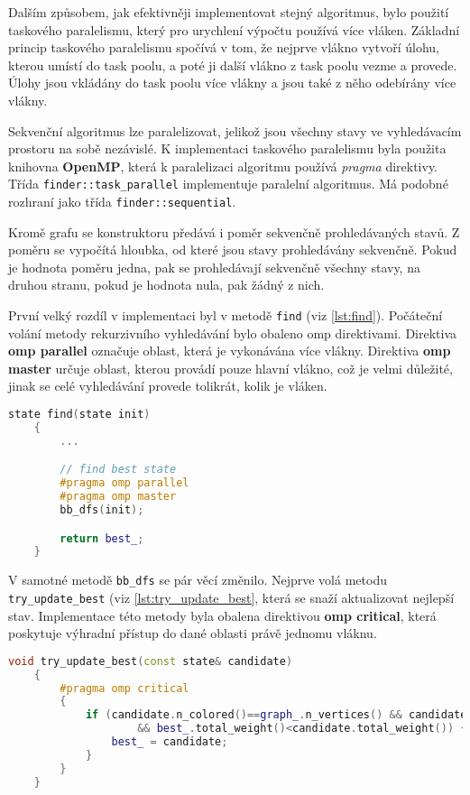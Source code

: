 Dalším způsobem, jak efektivněji implementovat stejný algoritmus, bylo použití taskového paralelismu, který pro urychlení výpočtu používá více vláken.
Základní princip taskového paralelismu spočívá v tom, že nejprve vlákno vytvoří úlohu, kterou umístí do task poolu, a poté ji další vlákno z task poolu vezme a provede.
Úlohy jsou vkládány do task poolu více vlákny a jsou také z něho odebírány více vlákny.

Sekvenční algoritmus lze paralelizovat, jelikož jsou všechny stavy ve vyhledávacím prostoru na sobě nezávislé.
K implementaci taskového paralelismu byla použita knihovna \textbf{OpenMP}, která k paralelizaci algoritmu používá \textit{pragma} direktivy.
Třída \texttt{finder::task\_parallel} implementuje paralelní algoritmus.
Má podobné rozhraní jako třída \texttt{finder::sequential}.

Kromě grafu se konstruktoru předává i poměr sekvenčně prohledávaných stavů.
Z poměru se vypočítá hloubka, od které jsou stavy prohledávány sekvenčně.
Pokud je hodnota poměru jedna, pak se prohledávají sekvenčně všechny stavy, na druhou stranu, pokud je hodnota nula, pak žádný z nich.

První velký rozdíl v implementaci byl v metodě \texttt{find} (viz \ref{lst:find}).
Počáteční volání metody rekurzivního vyhledávání bylo obaleno omp direktivami.
Direktiva \textbf{omp parallel} označuje oblast, která je vykonávána více vlákny.
Direktiva \textbf{omp master} určuje oblast, kterou provádí pouze hlavní vlákno, což je velmi důležité, jinak se celé vyhledávání provede tolikrát, kolik je vláken.

\begin{lstlisting}[language=C++, label={lst:find}, title={Metoda pro nalezení nejlepšího stavu}]
    state find(state init)
    {
        ...

        // find best state
        #pragma omp parallel
        #pragma omp master
        bb_dfs(init);

        return best_;
    }
\end{lstlisting}

V samotné metodě \texttt{bb\_dfs} se pár věcí změnilo.
Nejprve volá metodu \texttt{try\_update\_best} (viz \ref{lst:try_update_best}, která se snaží aktualizovat nejlepší stav.
Implementace této metody byla obalena direktivou \textbf{omp critical}, která poskytuje výhradní přístup do dané oblasti právě jednomu vláknu.

\begin{lstlisting}[language=C++, label={lst:try_update_best}, title={Metoda pro pokus o aktualizaci nejlepšího stavu}]
    void try_update_best(const state& candidate)
    {
        #pragma omp critical
        {
            if (candidate.n_colored()==graph_.n_vertices() && candidate.subgraph_connected()
                    && best_.total_weight()<candidate.total_weight()) {
                best_ = candidate;
            }
        }
    }
\end{lstlisting}

